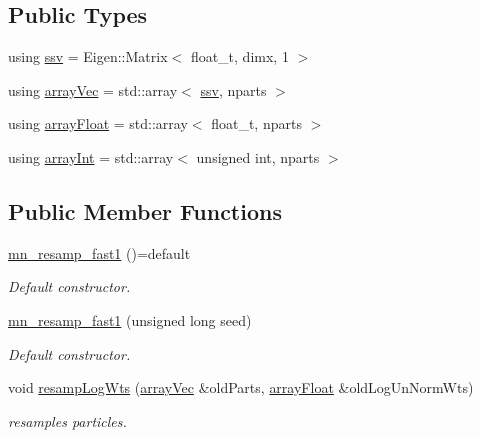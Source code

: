 \subsection*{Public Types}
\begin{DoxyCompactItemize}
\item 
using \hyperlink{classmn__resamp__fast1_a262ade482db1a5205579fb30dd39335a}{ssv} = Eigen\+::\+Matrix$<$ float\+\_\+t, dimx, 1 $>$
\item 
using \hyperlink{classmn__resamp__fast1_af55a3279b6b865cb2656ea4e7e832136}{array\+Vec} = std\+::array$<$ \hyperlink{classrbase_ae20e0b8df15aa109252f57ecbf1f20f8}{ssv}, nparts $>$
\item 
using \hyperlink{classmn__resamp__fast1_a9c95e7078cc9709024031bac44b431d6}{array\+Float} = std\+::array$<$ float\+\_\+t, nparts $>$
\item 
using \hyperlink{classmn__resamp__fast1_a8bf919fd596ab39fccbe152f5a742022}{array\+Int} = std\+::array$<$ unsigned int, nparts $>$
\end{DoxyCompactItemize}
\subsection*{Public Member Functions}
\begin{DoxyCompactItemize}
\item 
\mbox{\label{classmn__resamp__fast1_ac59dde1e16dc40fc173e81edd4b5c3b9}} 
\hyperlink{classmn__resamp__fast1_ac59dde1e16dc40fc173e81edd4b5c3b9}{mn\+\_\+resamp\+\_\+fast1} ()=default
\begin{DoxyCompactList}\small\item\em Default constructor. \end{DoxyCompactList}\item 
\mbox{\label{classmn__resamp__fast1_ac0b186d03e5ba10a470a34c453f14f9c}} 
\hyperlink{classmn__resamp__fast1_ac0b186d03e5ba10a470a34c453f14f9c}{mn\+\_\+resamp\+\_\+fast1} (unsigned long seed)
\begin{DoxyCompactList}\small\item\em Default constructor. \end{DoxyCompactList}\item 
void \hyperlink{classmn__resamp__fast1_a398e64faa29bafd345c0258ca90d489c}{resamp\+Log\+Wts} (\hyperlink{classrbase_aa12fc826befa6ba0647b5f59ebc396ee}{array\+Vec} \&old\+Parts, \hyperlink{classrbase_a6f76bef853e508cb5b6f546d231b06f5}{array\+Float} \&old\+Log\+Un\+Norm\+Wts)
\begin{DoxyCompactList}\small\item\em resamples particles. \end{DoxyCompactList}\end{DoxyCompactItemize}
